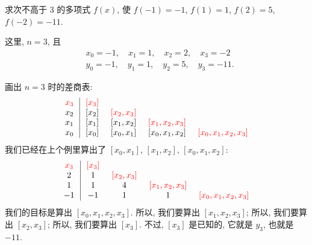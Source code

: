 \begin{example}
    求次不高于 $3$ 的多项式 $f(x)$, 使 $f(-1)=-1$, $f(1)=1$, $f(2)=5$, $f(-2) = -11$.

    这里, $n = 3$, 且
    \begin{align*}
         & x_0 = -1, \quad x_1 = 1, \quad x_2 = 2, \quad x_3 = -2   \\
         & y_0 = -1, \quad y_1 = 1, \quad y_2 = 5, \quad y_3 = -11.
    \end{align*}

    画出 $n = 3$ 时的差商表:
    \begin{align*}
        \arraycolsep=0.25cm
        \begin{array}{c|cccc}
            \textcolor{red}{x_3} & \textcolor{red}{[x_3]} & \                           & \                                & \                                     \\
            x_2                  & [x_2]                  & \textcolor{red}{[x_2, x_3]} & \                                & \                                     \\
            x_1                  & [x_1]                  & [x_1, x_2]                  & \textcolor{red}{[x_1, x_2, x_3]} & \                                     \\
            x_0                  & [x_0]                  & [x_0, x_1]                  & [x_0, x_1, x_2]                  & \textcolor{red}{[x_0, x_1, x_2, x_3]} \\
        \end{array}
    \end{align*}
    我们已经在上个例里算出了 $[x_0, x_1]$, $[x_1, x_2]$, $[x_0, x_1, x_2]$:
    \begin{align*}
        \arraycolsep=0.25cm
        \begin{array}{c|cccc}
            \textcolor{red}{x_3} & \textcolor{red}{[x_3]} & \                           & \                                & \                                     \\
            2                    & 1                      & \textcolor{red}{[x_2, x_3]} & \                                & \                                     \\
            1                    & 1                      & 4                           & \textcolor{red}{[x_1, x_2, x_3]} & \                                     \\
            -1                   & -1                     & 1                           & 1                                & \textcolor{red}{[x_0, x_1, x_2, x_3]} \\
        \end{array}
    \end{align*}
    我们的目标是算出 $[x_0, x_1, x_2, x_3]$. 所以, 我们要算出 $[x_1, x_2, x_3]$; 所以, 我们要算出 $[x_2, x_3]$; 所以, 我们要算出 $[x_3]$. 不过, $[x_3]$ 是已知的, 它就是 $y_3$, 也就是 $-11$.


\end{example}
